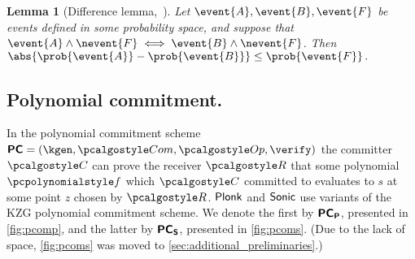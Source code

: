 \let\accentvec\vec \documentclass[runningheads]{llncs}
\newtheorem{lemma}[theorem]{Lemma}
\begin{document}
\begin{lemma}[Difference lemma,~{\cite[Lemma 1]{EPRINT:Shoup04}}]
	\label{lem:difference_lemma}
	Let $\event{A}, \event{B}, \event{F}$ be events defined in some probability
	space, and suppose that $\event{A} \land \nevent{F} \iff \event{B}
		\land \nevent{F}$.  Then 
	$
		\abs{\prob{\event{A}} - \prob{\event{B}}} \leq \prob{\event{F}}\,.
	$
\end{lemma}

\subsection{Polynomial commitment.}
\label{sec:poly_com}
In the polynomial commitment scheme $\PCOM = (\kgen, \com, \open, \verify)$ the
committer $\committer$ can prove the receiver $\receiver$ that some polynomial
$\p{f}$ which $\committer$ committed to evaluates to $s$ at some point $z$
chosen by $\receiver$. $\textnormal{\textsf{Plonk}}$ and ${\textnormal{\textsf{Sonic}}}$ use variants of the KZG polynomial
commitment scheme. We denote the first by $\bm{\mathsf{PC}}_{\bm{\mathsf{P}}}$, presented in
\cref{fig:pcomp}, and the latter by $\bm{\mathsf{PC}}_{\bm{\mathsf{S}}}$, presented in \cref{fig:pcoms}.
(Due to the lack of space, \cref{fig:pcoms} was moved to
\cref{sec:additional_preliminaries}.)
%
%
\end{document}
